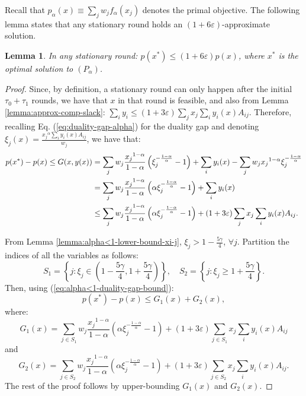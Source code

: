\documentclass[11pt]{article}
\newtheorem{lemma}[theorem]{Lemma}
\begin{document}
Recall that $p_{\alpha}(x)\equiv\sum_j w_j f_{\alpha}(x_j)$ denotes the primal objective. The following lemma states that any stationary round holds an $(1+6\varepsilon)$-approximate solution.
\begin{lemma}\label{lemma:alpha<1-stationary-round}
In any stationary round: $p(x^*)\leq (1+6\varepsilon)p(x)$, where $x^*$ is the optimal solution to $(P_{\alpha})$.
\end{lemma}
\begin{proof}
Since, by definition, a stationary round can only happen after the initial $\tau_0 + \tau_1$ rounds, we have that $x$ in that round is feasible, and also from Lemma \ref{lemma:approx-comp-slack}: $\sum_i y_i \leq (1+3\varepsilon)\sum_j x_j \sum_i y_i(x)A_{ij}$. Therefore, recalling Eq. (\ref{eq:duality-gap-alpha}) for the duality gap and denoting $\xi_j(x) = \frac{{x_j}^{\alpha}\sum_i y_i(x)A_{ij}}{w_j}$, we have that:
\begin{align}
p(x^*)-p(x)\leq G(x, y(x)) &= \sum_j w_j \frac{{x_j}^{1-\alpha}}{1-\alpha}\left(\xi_j^{-\frac{1-\alpha}{\alpha}}-1\right)+\sum_i y_i(x) - \sum_j w_j {x_j}^{1-\alpha}\xi_j^{-\frac{1-\alpha}{\alpha}}\notag\\
&=\sum_j w_j \frac{{x_j}^{1-\alpha}}{1-\alpha}\left(\alpha \xi_j^{-\frac{1-\alpha}{\alpha}}-1\right) + \sum_i y_i(x)\notag\\
&\leq \sum_j w_j \frac{{x_j}^{1-\alpha}}{1-\alpha}\left(\alpha \xi_j^{-\frac{1-\alpha}{\alpha}}-1\right) + (1+3\varepsilon)\sum_j x_j \sum_i y_i(x)A_{ij}. \label{eq:alpha<1-duality-gap-bound}
\end{align}

From Lemma \ref{lemma:alpha<1-lower-bound-xi-j}, $\xi_j > 1-\frac{5\gamma}{4}$, $\forall j$. Partition the indices of all the variables as follows:
\begin{equation*}
S_1 = \left\{j: \xi_j \in \left(1-\frac{5\gamma}{4}, 1+\frac{5\gamma}{4}\right)\right\}, \quad S_2 = \left\{j: \xi_j \geq 1+\frac{5\gamma}{4}\right\}.
\end{equation*}
Then, using (\ref{eq:alpha<1-duality-gap-bound}):
\begin{equation*}
p(x^*)-p(x)\leq G_1(x) + G_2(x),
\end{equation*}
where:
\begin{equation*}
G_1(x) = \sum_{j\in S_1} w_j \frac{{x_j}^{1-\alpha}}{1-\alpha}\left(\alpha \xi_j^{-\frac{1-\alpha}{\alpha}}-1\right) + (1+3\varepsilon)\sum_{j\in S_1}  x_j \sum_i y_i(x)A_{ij}
\end{equation*}
and 
\begin{equation*}
G_2(x) = \sum_{j\in S_2} w_j \frac{{x_j}^{1-\alpha}}{1-\alpha}\left(\alpha \xi_j^{-\frac{1-\alpha}{\alpha}}-1\right) + (1+3\varepsilon)\sum_{j\in S_2}  x_j \sum_i y_i(x)A_{ij}.
\end{equation*}
The rest of the proof follows by upper-bounding $G_1(x)$ and $G_2(x)$.


\end{proof}
\end{document}
